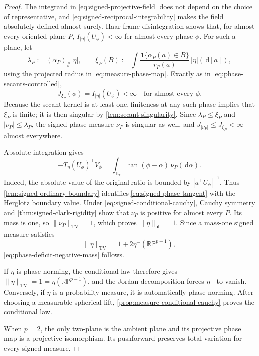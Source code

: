 \documentclass[11pt]{article}
\numberwithin{equation}{section}
\theoremstyle{thmstyleone}%
\theoremstyle{thmstyletwo}%
\let\cref\autoref
\newcommand{\dd}{\,\mathrm d}
\begin{document}
\begin{proof}
The integrand in \cref{eq:signed-projective-field} does not depend on the
choice of representative, and \cref{eq:signed-reciprocal-integrability}
makes the field absolutely defined almost surely.  Haar-frame
disintegration shows that, for almost every oriented plane \(P\),
\(I_{|\eta|}(U_\phi)<\infty\) for almost every phase \(\phi\).  For such a
plane, let
\[
  \lambda_P:=(\alpha_P)_\#|\eta|,
  \qquad
  \xi_P(B):=\int
    \frac{\boldsymbol 1\{\alpha_P(a)\in B\}}{r_P(a)}
    \,|\eta|(\dd[a]),
\]
using the projected radius in \cref{eq:measure-phase-map}.  Exactly as in
\cref{eq:phase-secants-controlled},
\[
  J_{\xi_P}(\phi)=I_{|\eta|}(U_\phi)<\infty
  \quad\text{for almost every }\phi.
\]
Because the secant kernel is at least one, finiteness at any such phase
implies that \(\xi_P\) is finite; it is then singular by
\cref{lem:secant-singularity}.  Since
\(\lambda_P\leq\xi_P\) and \(|\nu_P|\leq\lambda_P\), the signed phase
measure \(\nu_P\) is singular as well, and
\(J_{|\nu_P|}\leq J_{\xi_P}<\infty\) almost everywhere.

Absolute integration gives
\begin{equation}
  -T_\eta(U_\phi)^\top V_\phi
  =\int_{\mathbb T_\pi}
      \tan(\phi-\alpha)\,\nu_P(\dd\alpha).
  \label{eq:signed-phase-tangent}
\end{equation}
Indeed, the absolute value of the original ratio is bounded by
\(|a^\top U_\phi|^{-1}\).  Thus
\cref{lem:signed-ordinary-boundary} identifies
\cref{eq:signed-phase-tangent} with the Herglotz boundary value.  Under
\cref{eq:signed-conditional-cauchy}, Cauchy symmetry and
\cref{thm:signed-clark-rigidity} show that \(\nu_P\) is positive for almost
every \(P\).  Its mass is one, so \(\|\nu_P\|_{\mathrm{TV}}=1\), which
proves \(\|\eta\|_{\mathrm{ph}}=1\).  Since a mass-one signed measure
satisfies
\[
  \|\eta\|_{\mathrm{TV}}
  =1+2\eta^-(\mathbb{RP}^{p-1}),
\]
\cref{eq:phase-deficit-negative-mass} follows.

If \(\eta\) is phase norming, the conditional law therefore gives
\(\|\eta\|_{\mathrm{TV}}=1=\eta(\mathbb{RP}^{p-1})\), and the Jordan
decomposition forces \(\eta^-\) to vanish.  Conversely, if \(\eta\) is a
probability measure, it is automatically phase norming.  After choosing a
measurable spherical lift, \cref{prop:measure-conditional-cauchy} proves the
conditional law.

When \(p=2\), the only two-plane is the ambient plane and its projective
phase map is a projective isomorphism.  Its pushforward preserves total
variation for every signed measure.
\end{proof}
\end{document}
